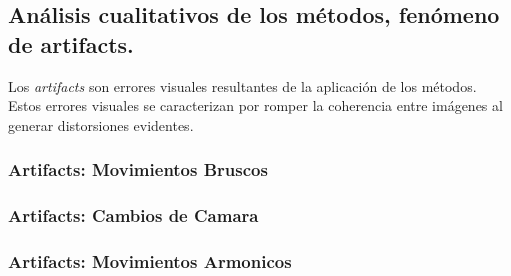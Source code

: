 \subsection{Análisis cualitativos de los métodos, fenómeno de artifacts.}
Los \textit{artifacts} son errores visuales resultantes de la aplicación de los métodos. Estos errores visuales se caracterizan por romper la coherencia entre imágenes al generar distorsiones evidentes.

\subsubsection{Artifacts: Movimientos Bruscos}

\subsubsection{Artifacts: Cambios de Camara}

\subsubsection{Artifacts: Movimientos Armonicos}
